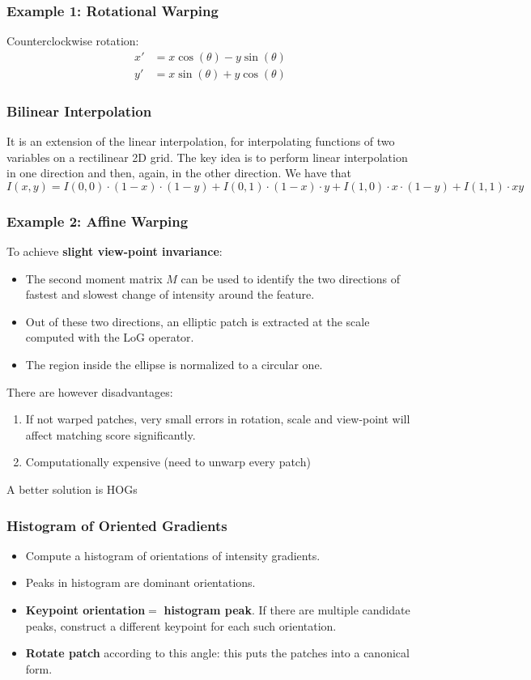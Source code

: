 \documentclass[a4paper,12 pt]{article}
\theoremstyle{definition}
\theoremstyle{remark}
\theoremstyle{definition}
\theoremstyle{definition}
\theoremstyle{definition}
\theoremstyle{remark}
\theoremstyle{definition}
\begin{document}
\subsubsection*{Example 1: Rotational Warping}
Counterclockwise rotation:
\begin{equation}
\begin{split}
x'&=x\cos(\theta)-y\sin(\theta)\\
y'&=x\sin(\theta)+y\cos(\theta)
\end{split}
\end{equation}
\subsubsection*{Bilinear Interpolation}
It is an extension of the linear interpolation, for interpolating functions of two variables on a rectilinear 2D grid. The key idea is to perform linear interpolation in one direction and then, again, in the other direction. We have that
\begin{equation}
I(x,y)=I(0,0)\cdot (1-x)\cdot (1-y)+I(0,1)\cdot (1-x)\cdot y+I(1,0)\cdot x \cdot (1-y)+I(1,1)\cdot xy
\end{equation}
\subsubsection*{Example 2: Affine Warping}
To achieve \textbf{slight view-point invariance}:
\begin{itemize}
\item The second moment matrix $M$ can be used to identify the two directions of fastest and slowest change of intensity around the feature.
\item Out of these two directions, an elliptic patch is extracted at the scale computed with the LoG operator.
\item The region inside the ellipse is normalized to a circular one.
\end{itemize}
There are however disadvantages:
\begin{enumerate}[-]
\item If not warped patches, very small errors in rotation, scale and view-point will affect matching score significantly.
\item Computationally expensive (need to unwarp every patch)
\end{enumerate}
A better solution is HOGs
\subsubsection*{Histogram of Oriented Gradients}
\begin{itemize}
\item Compute a histogram of orientations of intensity gradients.
\item Peaks in histogram are dominant orientations.
\item \textbf{Keypoint orientation}$=$ \textbf{histogram peak}. If there are multiple candidate peaks, construct a different keypoint for each such orientation.
\item \textbf{Rotate patch} according to this angle: this puts the patches into a canonical form.
\end{itemize}
\end{document}
